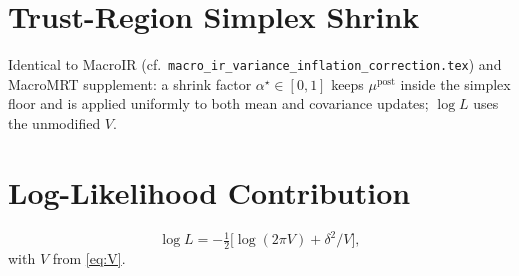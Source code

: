 \documentclass[11pt]{article}
\begin{document}
\section{Trust-Region Simplex Shrink}

Identical to MacroIR (cf.\ \texttt{macro\_ir\_variance\_inflation\_correction.tex})
and MacroMRT supplement: a shrink factor $\alpha^\star\in[0,1]$ keeps
$\mu^{\mathrm{post}}$ inside the simplex floor and is applied
uniformly to both mean and covariance updates; $\log L$ uses the
unmodified $V$.

\section{Log-Likelihood Contribution}

\begin{equation}
  \log L
  = -\tfrac{1}{2}\bigl[\log(2\pi V) + \delta^2/V\bigr],
\end{equation}
with $V$ from \eqref{eq:V}.
\end{document}
